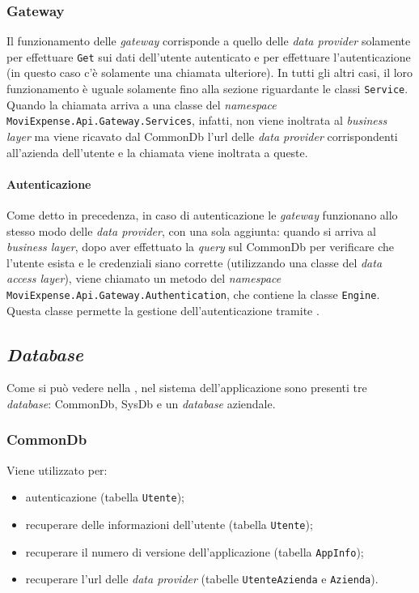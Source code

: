 \subsubsection{Gateway}

Il funzionamento delle  \textit{gateway} corrisponde a quello delle \textit{data provider} solamente per effettuare \texttt{Get} sui dati dell'utente autenticato e per effettuare l'autenticazione (in questo caso c'è solamente una chiamata ulteriore). In tutti gli altri casi, il loro funzionamento è uguale solamente fino alla sezione riguardante le classi \texttt{Service}. Quando la chiamata arriva a una classe del \textit{namespace} \texttt{MoviExpense.Api.Gateway.Services}, infatti, non viene inoltrata al \textit{business layer} ma viene ricavato dal CommonDb l'url delle  \textit{data provider} corrispondenti all'azienda dell'utente e la chiamata viene inoltrata a queste.

\paragraph{Autenticazione} Come detto in precedenza, in caso di autenticazione le  \textit{gateway} funzionano allo stesso modo delle \textit{data provider}, con una sola aggiunta: quando si arriva al \textit{business layer}, dopo aver effettuato la \textit{query} sul CommonDb per verificare che l'utente esista e le credenziali siano corrette (utilizzando una classe del \textit{data access layer}), viene chiamato un metodo del \textit{namespace} \texttt{MoviExpense.Api.Gateway.Authentication}, che contiene la classe \texttt{Engine}. Questa classe permette la gestione dell'autenticazione tramite .


\subsection{\textit{Database}}

Come si può vedere nella , nel sistema dell'applicazione sono presenti tre \textit{database}: CommonDb, SysDb e un \textit{database} aziendale.

\subsubsection{CommonDb}

Viene utilizzato per:
\begin{itemize}
    \item autenticazione (tabella \texttt{Utente});
    \item recuperare delle informazioni dell'utente (tabella \texttt{Utente});
    \item recuperare il numero di versione dell'applicazione (tabella \texttt{AppInfo});
    \item recuperare l'url delle  \textit{data provider} (tabelle \texttt{UtenteAzienda} e \texttt{Azienda}).
\end{itemize}

